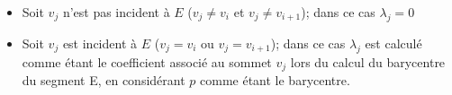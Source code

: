 \begin{itemize}

\item Soit $v_j$ n'est pas incident à $E$ ($v_j \neq v_i$ et $v_j \neq
v_{i+1}$); dans ce cas $\lambda_j = 0$

\item Soit $v_j$ est incident à $E$ ($v_j = v_i$ ou $v_j = v_{i+1}$); dans ce
cas $\lambda_j$ est calculé comme étant le coefficient associé au sommet $v_j$
lors du calcul du barycentre du segment E, en considérant $p$ comme étant le
barycentre.

\end{itemize}